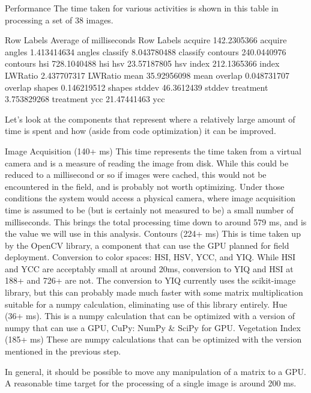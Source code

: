 \documentclass[letterpaper]{article}
\begin{document}
Performance
The time taken for various activities is shown in this table in processing a set of 38 images.








Row Labels
Average of milliseconds
Row Labels
acquire
142.2305366
acquire
angles
1.413414634
angles
classify
8.043780488
classify
contours
240.0440976
contours
hsi
728.1040488
hsi
hsv
23.57187805
hsv
index
212.1365366
index
LWRatio
2.437707317
LWRatio
mean
35.92956098
mean
overlap
0.048731707
overlap
shapes
0.146219512
shapes
stddev
46.3612439
stddev
treatment
3.753829268
treatment
ycc
21.47441463
ycc














Let’s look at the components that represent where a relatively large amount of time is spent and how (aside from code optimization) it can be improved.

Image Acquisition (140+ ms) This time represents the time taken from a virtual camera and is a measure of reading the image from disk. While this could be reduced to a millisecond or so if images were cached, this would not be encountered in the field, and is probably not worth optimizing. Under those conditions the system would access a physical camera, where image acquisition time is assumed to be (but is certainly not measured to be) a small number of milliseconds. This brings the total processing time down to around 579 ms, and is the value we will use in this analysis.
Contours (224+ ms) This is time taken up by the OpenCV library, a component that can use the GPU planned for field deployment.
Conversion to color spaces: HSI, HSV, YCC, and YIQ.  While HSI and YCC are acceptably small at around 20ms, conversion to YIQ and HSI at 188+ and 726+  are not. The  conversion to YIQ currently uses the scikit-image library, but this can probably made much faster with some matrix multiplication suitable for a numpy calculation, eliminating use of this library entirely.
Hue (36+ ms). This is a numpy calculation that can be optimized with a version of numpy that can use a GPU, CuPy: NumPy & SciPy for GPU.
Vegetation Index (185+ ms) These are numpy calculations that can be optimized with the version mentioned in the previous step.


In general, it should be possible to move any manipulation of a matrix to a GPU. A reasonable time target for the processing of a single image is around 200 ms.
\end{document}
